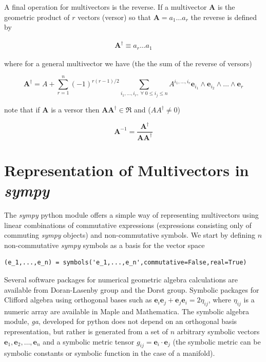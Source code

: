 \documentclass[12pt]{report}
\newcommand{\bm}[1]{\boldsymbol{#1}}
\newcommand{\bfrac}[2]{\displaystyle\frac{#1}{#2}}
\newcommand{\W}{\wedge}
\newcommand{\R}{\dagger}
\newcommand{\eb}{\bm{e}}
\begin{document}
A final operation for multivectors is the reverse.  If a multivector $\bm{A}$ is the geometric product of $r$ vectors (versor)
so that $\bm{A} = a_{1}\dots a_{r}$ the reverse is defined by

   \begin{align}
      \bm{A}^{\R} \equiv a_{r}\dots a_{1}
   \end{align}

where for a general multivector we have (the the sum of the reverse of versors)

   \begin{equation}
      \bm{A}^{\R} = A + \sum_{r=1}^{n}(-1)^{r(r-1)/2}\sum_{i_{1},\dots,i_{r},\;\forall\; 0\le i_{j} \le n} A^{i_{1},\dots,i_{r}}\eb_{i_{1}}\W \eb_{i_{2}}\W\dots\W \eb_{r}
   \end{equation}

note that if $\bm{A}$ is a versor then $\bm{A}\bm{A}^{\R}\in\Re$ and ($AA^{\R} \ne 0$)

   \begin{equation}
      \bm{A}^{-1} = \bfrac{\bm{A}^{\R}}{\bm{AA}^{\R}}
   \end{equation}

\section{Representation of Multivectors in \emph{sympy}}

The \emph{sympy} python module offers a simple way of representing multivectors using linear
combinations of commutative expressions (expressions consisting only of commuting \emph{sympy} objects)
and non-commutative symbols. We start by defining $n$ non-commutative \emph{sympy} symbols as a basis for
the vector space

\begin{lstlisting}[numbers=none]
   (e_1,...,e_n) = symbols('e_1,...,e_n',commutative=False,real=True)
\end{lstlisting}

Several software packages for numerical geometric algebra calculations are
available from Doran-Lasenby group and the Dorst group. Symbolic packages for
Clifford algebra using orthogonal bases such as
$\eb_{i}\eb_{j}+\eb_{j}\eb_{i} = 2\eta_{ij}$, where $\eta_{ij}$ is a numeric
array are available in Maple and Mathematica. The symbolic algebra module,
{\em ga}, developed for python does not depend on an orthogonal basis
representation, but rather is generated from a set of $n$ arbitrary
symbolic vectors $\eb_{1},\eb_{2},\dots,\eb_{n}$ and a symbolic metric
tensor $g_{ij} = \eb_{i}\cdot \eb_{j}$ (the symbolic metric can be symbolic constants
or symbolic function in the case of a manifold).
\end{document}
